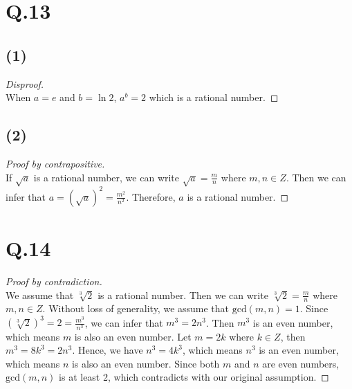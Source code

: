 \documentclass[a4paper,12pt]{article}
\begin{document}
\section*{Q.13}

\subsection*{(1)}
\begin{proof}[Disproof]
	$ $\\
	When $a = e$ and $b = \ln 2$, $a^b = 2$ which is a rational number.
\end{proof}

\subsection*{(2)}
\begin{proof}[Proof by contrapositive]
	$ $\\
	If $\sqrt{a}$ is a rational number, we can write $\sqrt{a} = \frac{m}{n}$ where $m,n \in Z$. 
	Then we can infer that $a = (\sqrt{a})^2 = \frac{m^2}{n^2}$.
	Therefore, $a$ is a rational number.
\end{proof}

\section*{Q.14}
\begin{proof}[Proof by contradiction]
	$ $\\
	We assume that $\sqrt[3]{2}$ is a rational number. 
	Then we can write $\sqrt[3]{2} = \frac{m}{n}$ where $m,n \in Z$.
	Without loss of generality, we assume that $\text{gcd} (m,n) = 1$.
	Since $(\sqrt[3]{2})^3 = 2 = \frac{m^3}{n^3}$, we can infer that $m^3 = 2n^3$.
	Then $m^3$ is an even number, which means $m$ is also an even number.
	Let $m = 2k$ where $k \in Z$, then $m^3 = 8k^3 = 2n^3$.
	Hence, we have $n^3 = 4k^3$, which means $n^3$ is an even number, which means $n$ is also an even number.
	Since both $m$ and $n$ are even numbers, $\text{gcd} (m,n)$ is at least 2, which contradicts with our original assumption.
\end{proof}
\end{document}
